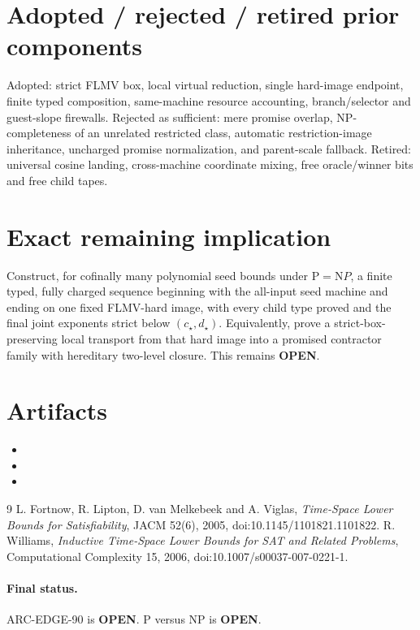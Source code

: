 \documentclass[11pt]{article}
\newcommand{\OPEN}{\textbf{OPEN}}
\begin{document}
\section{Adopted / rejected / retired prior components}
Adopted: strict FLMV box, local virtual reduction, single hard-image endpoint,
finite typed composition, same-machine resource accounting, branch/selector
and guest-slope firewalls.  Rejected as sufficient: mere promise overlap,
NP-completeness of an unrelated restricted class, automatic restriction-image
inheritance, uncharged promise normalization, and parent-scale fallback.
Retired: universal cosine landing, cross-machine coordinate mixing, free
oracle/winner bits and free child tapes.

\section{Exact remaining implication}
Construct, for cofinally many polynomial seed bounds under $\mathrm P=\mathrm
NP$, a finite typed, fully charged sequence beginning with the all-input seed
machine and ending on one fixed FLMV-hard image, with every child type proved
and the final joint exponents strict below $(c_\star,d_\star)$.  Equivalently,
prove a strict-box-preserving local transport from that hard image into a
promised contractor family with hereditary two-level closure.  This remains
\OPEN{}.

\section{Artifacts}
\begin{itemize}
\item {}
\item {}
\item {}
\end{itemize}

\begin{thebibliography}{9}
 L. Fortnow, R. Lipton, D. van Melkebeek and A. Viglas,
\emph{Time-Space Lower Bounds for Satisfiability}, JACM 52(6), 2005,
doi:10.1145/1101821.1101822.
 R. Williams, \emph{Inductive Time-Space Lower Bounds for
SAT and Related Problems}, Computational Complexity 15, 2006,
doi:10.1007/s00037-007-0221-1.
\end{thebibliography}

\paragraph{Final status.} ARC-EDGE-90 is \OPEN{}.  P versus NP is \OPEN{}.
\end{document}
